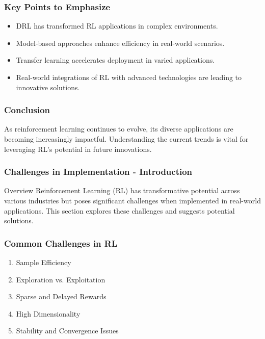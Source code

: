 \documentclass{beamer}
\begin{document}
\begin{frame}[fragile]
    \frametitle{Key Points to Emphasize}
    \begin{itemize}
        \item DRL has transformed RL applications in complex environments.
        \item Model-based approaches enhance efficiency in real-world scenarios.
        \item Transfer learning accelerates deployment in varied applications.
        \item Real-world integrations of RL with advanced technologies are leading to innovative solutions.
    \end{itemize}
\end{frame}

\begin{frame}[fragile]
    \frametitle{Conclusion}
    \begin{block}{}
        As reinforcement learning continues to evolve, its diverse applications are becoming increasingly impactful. Understanding the current trends is vital for leveraging RL's potential in future innovations.
    \end{block}
\end{frame}

\begin{frame}[fragile]
    \frametitle{Challenges in Implementation - Introduction}
    \begin{block}{Overview}
        Reinforcement Learning (RL) has transformative potential across various industries but poses significant challenges when implemented in real-world applications. 
        This section explores these challenges and suggests potential solutions. 
    \end{block}
\end{frame}

\begin{frame}[fragile]
    \frametitle{Common Challenges in RL}
    \begin{enumerate}
        \item Sample Efficiency
        \item Exploration vs. Exploitation
        \item Sparse and Delayed Rewards
        \item High Dimensionality
        \item Stability and Convergence Issues
    \end{enumerate}
\end{frame}
\end{document}
